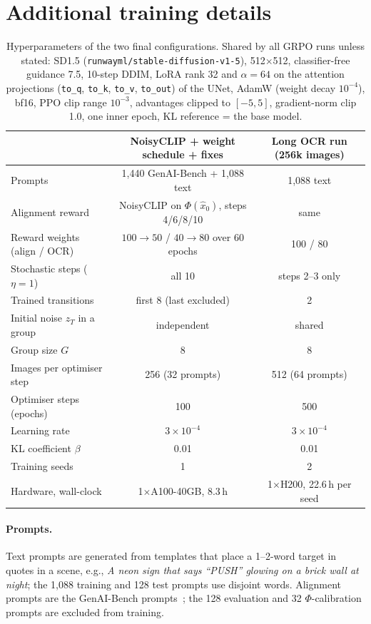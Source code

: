 \documentclass{article}
\newcommand{\xhat}{\hat{x}_0}
\begin{document}
\section{Additional training details}
\label{app:details}
\begin{table}[h]
  \caption{Hyperparameters of the two final configurations. Shared by all GRPO runs unless stated: SD1.5
  (\texttt{runwayml/stable-diffusion-v1-5}), 512$\times$512, classifier-free guidance 7.5, 10-step DDIM, LoRA rank 32 and
  $\alpha=64$ on the attention projections (\texttt{to\_q}, \texttt{to\_k}, \texttt{to\_v}, \texttt{to\_out}) of the UNet, AdamW
  (weight decay $10^{-4}$), bf16, PPO clip range $10^{-3}$, advantages clipped to $[-5,5]$, gradient-norm clip 1.0, one inner epoch,
  KL reference = the base model.}
  \label{tab:hparams}
  \centering
  \small
  \begin{tabular}{lcc}
    \toprule
    & NoisyCLIP + weight schedule + fixes & Long OCR run (256k images) \\
    \midrule
    Prompts & 1{,}440 GenAI-Bench + 1{,}088 text & 1{,}088 text \\
    Alignment reward & NoisyCLIP on $\Phi(\xhat)$, steps 4/6/8/10 & same \\
    Reward weights (align / OCR) & $100\to50$ / $40\to80$ over 60 epochs & 100 / 80 \\
    Stochastic steps ($\eta=1$) & all 10 & steps 2--3 only \\
    Trained transitions & first 8 (last excluded) & 2 \\
    Initial noise $z_T$ in a group & independent & shared \\
    Group size $G$ & 8 & 8 \\
    Images per optimiser step & 256 (32 prompts) & 512 (64 prompts) \\
    Optimiser steps (epochs) & 100 & 500 \\
    Learning rate & $3\times10^{-4}$ & $3\times10^{-4}$ \\
    KL coefficient $\beta$ & 0.01 & 0.01 \\
    Training seeds & 1 & 2 \\
    Hardware, wall-clock & 1$\times$A100-40GB, 8.3\,h & 1$\times$H200, 22.6\,h per seed \\
    \bottomrule
  \end{tabular}
\end{table}

\paragraph{Prompts.} Text prompts are generated from templates that place a 1--2-word target in quotes in a scene, e.g.,
\emph{A neon sign that says ``PUSH'' glowing on a brick wall at night}; the 1{,}088 training and 128 test prompts use disjoint
words. Alignment prompts are the GenAI-Bench prompts~\citep{li2024genaibench}; the 128 evaluation and 32 $\Phi$-calibration
prompts are excluded from training.
\end{document}
